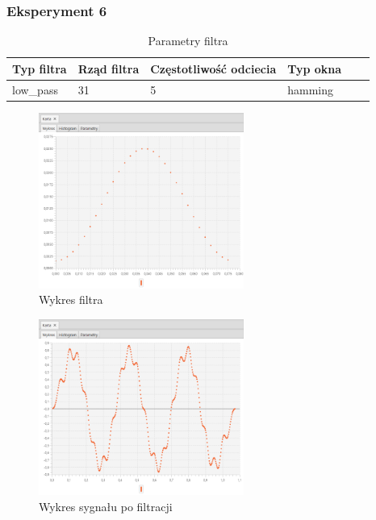 \documentclass[12pt]{article}
\begin{document}
{{            \subsubsection{Eksperyment 6} {
                \begin{table}[H]
                \centering
                \begin{tabular}{|l|l|l|l|l|l|}
                \hline
                Typ filtra & Rząd filtra & Częstotliwość odciecia & Typ okna  \\\hline
                low\_pass & 31 & 5 & hamming     \\\hline
                \end{tabular}
                \caption{Parametry filtra}
                \end{table}
                \begin{figure}[H]
                \centering
                \includegraphics[width=0.6\textwidth]{img/result/filter/experiment06/data_draw_2b_filter_data_114016.png}
                \caption{Wykres filtra}
                \end{figure}

                \begin{figure}[H]
                \centering
                \includegraphics[width=0.6\textwidth]{img/result/filter/experiment06/data_draw_2b_result_data_114019.png}
                \caption{Wykres sygnału po filtracji}
                \end{figure}
            }
            \newpage

}}
\end{document}
